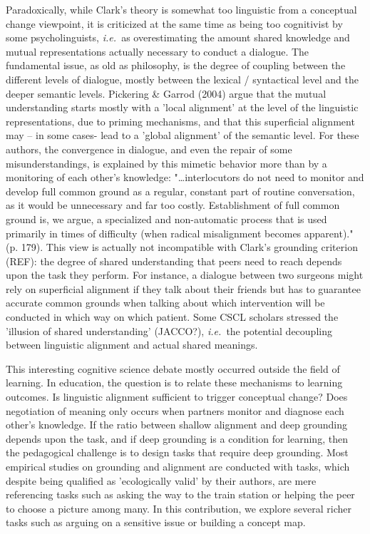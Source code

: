 \documentclass[twocolumn]{article}
\newcommand{\ie}{{\textit{i.e.\ }}}
\begin{document}
Paradoxically, while Clark's theory is somewhat too linguistic from a conceptual
change viewpoint, it is criticized at the same time as being too cognitivist by
some psycholinguists, \ie as overestimating the amount shared knowledge and
mutual representations actually necessary to conduct a dialogue. The fundamental
issue, as old as philosophy, is the degree of coupling between the different
levels of dialogue, mostly between the lexical / syntactical level and the
deeper semantic levels. Pickering \& Garrod (2004) argue that the mutual
understanding starts mostly with a 'local alignment' at the level of the
linguistic representations, due to priming mechanisms, and that this superficial
alignment may – in some cases- lead to a 'global alignment' of the semantic
level.  For these authors, the convergence in dialogue, and even the repair of
some misunderstandings, is explained by this mimetic behavior more than by a
monitoring of each other's knowledge: "…interlocutors do not need to monitor and
develop full common ground as a regular, constant part of routine conversation,
as it would be unnecessary and far too costly. Establishment of full common
ground is, we argue, a specialized and non-automatic process that is used
primarily in times of difficulty (when radical misalignment becomes apparent)."
(p. 179). This view is actually not incompatible with Clark's grounding
criterion (REF): the degree of shared understanding that peers need to reach
depends upon the task they perform. For instance, a dialogue between two
surgeons might rely on superficial alignment if they talk about their friends
but has to guarantee accurate common grounds when talking about which
intervention will be conducted in which way on which patient.  Some CSCL
scholars stressed the 'illusion of shared understanding' (JACCO?), \ie the
potential decoupling between linguistic alignment and actual shared meanings.

This interesting cognitive science debate mostly occurred outside the field of
learning. In education, the question is to relate these mechanisms to learning
outcomes. Is linguistic alignment sufficient to trigger conceptual change? Does
negotiation of meaning only occurs when partners monitor and diagnose each
other's knowledge. If the ratio between shallow alignment and deep grounding
depends upon the task, and if deep grounding is a condition for learning, then
the pedagogical challenge is to design tasks that require deep grounding. Most
empirical studies on grounding and alignment are conducted with tasks, which
despite being qualified as 'ecologically valid' by their authors, are mere
referencing tasks such as asking the way to the train station or helping the
peer to choose a picture among many. In this contribution, we explore several
richer tasks such as arguing on a sensitive issue or building a concept map.  
\end{document}
